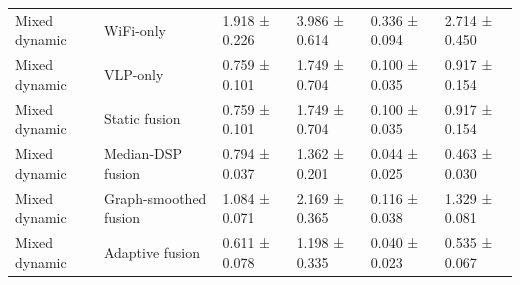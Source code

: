 \begin{tabular}{llllll}
Mixed dynamic & WiFi-only & 1.918 ± 0.226 & 3.986 ± 0.614 & 0.336 ± 0.094 & 2.714 ± 0.450 \\
Mixed dynamic & VLP-only & 0.759 ± 0.101 & 1.749 ± 0.704 & 0.100 ± 0.035 & 0.917 ± 0.154 \\
Mixed dynamic & Static fusion & 0.759 ± 0.101 & 1.749 ± 0.704 & 0.100 ± 0.035 & 0.917 ± 0.154 \\
Mixed dynamic & Median-DSP fusion & 0.794 ± 0.037 & 1.362 ± 0.201 & 0.044 ± 0.025 & 0.463 ± 0.030 \\
Mixed dynamic & Graph-smoothed fusion & 1.084 ± 0.071 & 2.169 ± 0.365 & 0.116 ± 0.038 & 1.329 ± 0.081 \\
Mixed dynamic & Adaptive fusion & 0.611 ± 0.078 & 1.198 ± 0.335 & 0.040 ± 0.023 & 0.535 ± 0.067 \\
\bottomrule
\end{tabular}
